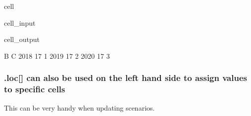 \documentclass[letterpaper,10pt,english]{jupyterBook}
\begin{document}
\begin{sphinxuseclass}{cell}\begin{sphinxVerbatimInput}

\begin{sphinxuseclass}{cell_input}
\begin{sphinxVerbatim}[commandchars=\\\{\}]
\PYG{p}{[}\PYG{p}{[}\PYG{p}{]}\PYG{p}{]}
\end{sphinxVerbatim}

\end{sphinxuseclass}\end{sphinxVerbatimInput}
\begin{sphinxVerbatimOutput}

\begin{sphinxuseclass}{cell_output}
\begin{sphinxVerbatim}[commandchars=\\\{\}]
       B  C
2018  17  1
2019  17  2
2020  17  3
\end{sphinxVerbatim}

\end{sphinxuseclass}\end{sphinxVerbatimOutput}

\end{sphinxuseclass}

\subsubsection{.loc{[}{]} can also be used on the left hand side to assign values to specific cells}
\label{\detokenize{content/04_PythonEssentials/PythonPackagesEtc:loc-can-also-be-used-on-the-left-hand-side-to-assign-values-to-specific-cells}}
\sphinxAtStartPar
This can be very handy when updating scenarios.
\end{document}
